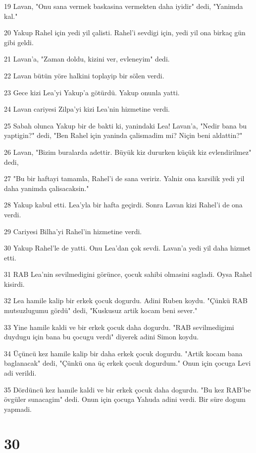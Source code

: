 \par 19 Lavan, "Onu sana vermek baskasina vermekten daha iyidir" dedi, "Yanimda kal."
\par 20 Yakup Rahel için yedi yil çalisti. Rahel'i sevdigi için, yedi yil ona birkaç gün gibi geldi.
\par 21 Lavan'a, "Zaman doldu, kizini ver, evleneyim" dedi.
\par 22 Lavan bütün yöre halkini toplayip bir sölen verdi.
\par 23 Gece kizi Lea'yi Yakup'a götürdü. Yakup onunla yatti.
\par 24 Lavan cariyesi Zilpa'yi kizi Lea'nin hizmetine verdi.
\par 25 Sabah olunca Yakup bir de bakti ki, yanindaki Lea! Lavan'a, "Nedir bana bu yaptigin?" dedi, "Ben Rahel için yaninda çalismadim mi? Niçin beni aldattin?"
\par 26 Lavan, "Bizim buralarda adettir. Büyük kiz dururken küçük kiz evlendirilmez" dedi,
\par 27 "Bu bir haftayi tamamla, Rahel'i de sana veririz. Yalniz ona karsilik yedi yil daha yanimda çalisacaksin."
\par 28 Yakup kabul etti. Lea'yla bir hafta geçirdi. Sonra Lavan kizi Rahel'i de ona verdi.
\par 29 Cariyesi Bilha'yi Rahel'in hizmetine verdi.
\par 30 Yakup Rahel'le de yatti. Onu Lea'dan çok sevdi. Lavan'a yedi yil daha hizmet etti.
\par 31 RAB Lea'nin sevilmedigini görünce, çocuk sahibi olmasini sagladi. Oysa Rahel kisirdi.
\par 32 Lea hamile kalip bir erkek çocuk dogurdu. Adini Ruben koydu. "Çünkü RAB mutsuzlugumu gördü" dedi, "Kuskusuz artik kocam beni sever."
\par 33 Yine hamile kaldi ve bir erkek çocuk daha dogurdu. "RAB sevilmedigimi duydugu için bana bu çocugu verdi" diyerek adini Simon koydu.
\par 34 Üçüncü kez hamile kalip bir daha erkek çocuk dogurdu. "Artik kocam bana baglanacak" dedi, "Çünkü ona üç erkek çocuk dogurdum." Onun için çocuga Levi adi verildi.
\par 35 Dördüncü kez hamile kaldi ve bir erkek çocuk daha dogurdu. "Bu kez RAB'be övgüler sunacagim" dedi. Onun için çocuga Yahuda adini verdi. Bir süre dogum yapmadi.

\chapter{30}

